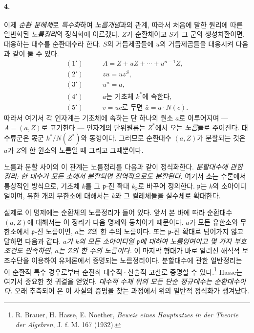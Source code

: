 \paragraph{4.}
이제 \emph{순환 분해체}로 \emph{특수화}하여 \emph{노름개념}과의 관계, 따라서 처음에 말한 원리에 따른 일반화된 \emph{노름정리}의 정식화에 이르겠다. \(Z\)가 순환체이고 \(S\)가 그 군의 생성치환이면, 대응하는 대수를 순환대수라 한다. \(S\)의 거듭제곱들에 \(u\)의 거듭제곱들을 대응시켜 다음과 같이 둘 수 있다.
\[
\begin{aligned}
(1')\qquad &A=Z+uZ+\cdots+u^{n-1}Z,\\
(2')\qquad &zu=uz^S,\\
(3')\quad &u^n=a,\\
(4')\quad &a\text{는 기초체 }k^\ast\text{에 속한다},\\
(5')\quad &v=uc\text{로 두면 }\bar a=a\cdot N(c).
\end{aligned}
\]
따라서 여기서 각 인자계는 기초체에 속하는 단 하나의 원소 \(a\)로 이루어지며 --- \(A=(a,Z)\)로 표기한다 --- 인자계의 단위원류는 \(Z^\ast\)에서 오는 \emph{노름}들로 주어진다. 대수류군은 몫군 \(k^\ast/N(Z^\ast)\)와 동형이다.
그러므로 순환대수 \((a,Z)\)가 분할되는 것은 \(a\)가 \(Z\)의 한 원소의 노름일 때 그리고 그때뿐이다.

노름과 분할 사이의 이 관계는 \glqq{}노름정리\grqq{}를 다음과 같이 정식화한다. \emph{분할대수에 관한 정리: 한 대수가 모든 소에서 분할되면 전역적으로도 분할된다.} 여기서 \glqq{}소\grqq{}는 수론에서 통상적인 방식으로, 기초체 \(k\)를 그 \(\mathfrak p\)-진 확대 \(k_{\mathfrak p}\)로 바꾸어 정의한다. \(\mathfrak p\)는 \(k\)의 소아이디얼이며, 유한 개의 무한소에 대해서는 \(k\)와 그 켤레체들을 실수체로 확대한다.

실제로 이 명제에는 순환체의 노름정리가 들어 있다. 앞서 본 바에 따라 순환대수 \((a,Z)\)에 대해서는 이 정리가 다음 명제와 동치이기 때문이다. \(a\)가 모든 유한소와 무한소에서 \(\mathfrak p\)-진 노름이면, \(a\)는 \(Z\)의 한 수의 노름이다. 또는 \(\mathfrak p\)-진 확대로 넘어가지 않고 말하면 다음과 같다. \emph{\(a\)가 \(k\)의 모든 소아이디얼 \(\mathfrak p\)에 대하여 노름잉여이고 몇 가지 부호조건도 만족하면, \(a\)는 \(Z\)의 한 수의 노름이다.} 이 마지막 형태가 바로 알려진 해석적 보조수단을 이용하여 유체론에서 증명되는 노름정리이다. 분할대수에 관한 일반정리는 이 순환적 특수 경우로부터 순전히 대수적·산술적 고찰로 증명할 수 있다.\footnote{R. Brauer, H. Hasse, E. Noether, \emph{Beweis eines Hauptsatzes in der Theorie der Algebren}, J. f. M. 167 (1932).} Hasse는 여기서 중요한 첫 귀결을 얻었다. \emph{대수적 수체 위의 모든 단순 정규대수는 순환대수이다.} 오래 추측되어 온 이 사실의 증명을 찾는 과정에서 위의 일반적 정식화가 생겨났다.


